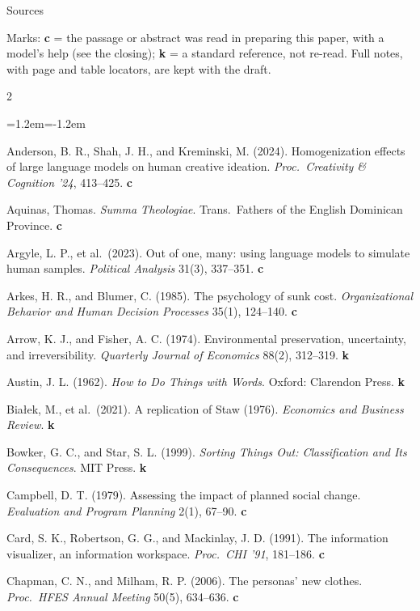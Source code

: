 \documentclass[11pt,a4paper]{article}
\newcounter{art}
\begin{document}
\clearpage
{\centering\large Sources\par}
\vspace{3mm}
\small
\noindent Marks: \textbf{c} = the passage or abstract was read in preparing this paper, with a model's help (see the closing); \textbf{k} = a standard reference, not re-read. Full notes, with page and table locators, are kept with the draft.
\vspace{2mm}
\begin{multicols}{2}\footnotesize\raggedright
\begin{list}{}{\leftmargin=1.2em\itemindent=-1.2em\itemsep=1pt}
\item Anderson, B. R., Shah, J. H., and Kreminski, M. (2024). Homogenization effects of large language models on human creative ideation. \textit{Proc.\ Creativity \& Cognition '24}, 413--425. \textbf{c}
\item Aquinas, Thomas. \textit{Summa Theologiae}. Trans.\ Fathers of the English Dominican Province. \textbf{c}
\item Argyle, L. P., et al.\ (2023). Out of one, many: using language models to simulate human samples. \textit{Political Analysis} 31(3), 337--351. \textbf{c}
\item Arkes, H. R., and Blumer, C. (1985). The psychology of sunk cost. \textit{Organizational Behavior and Human Decision Processes} 35(1), 124--140. \textbf{c}
\item Arrow, K. J., and Fisher, A. C. (1974). Environmental preservation, uncertainty, and irreversibility. \textit{Quarterly Journal of Economics} 88(2), 312--319. \textbf{k}
\item Austin, J. L. (1962). \textit{How to Do Things with Words}. Oxford: Clarendon Press. \textbf{k}
\item Białek, M., et al.\ (2021). A replication of Staw (1976). \textit{Economics and Business Review}. \textbf{k}
\item Bowker, G. C., and Star, S. L. (1999). \textit{Sorting Things Out: Classification and Its Consequences}. MIT Press. \textbf{k}
\item Campbell, D. T. (1979). Assessing the impact of planned social change. \textit{Evaluation and Program Planning} 2(1), 67--90. \textbf{c}
\item Card, S. K., Robertson, G. G., and Mackinlay, J. D. (1991). The information visualizer, an information workspace. \textit{Proc.\ CHI '91}, 181--186. \textbf{c}
\item Chapman, C. N., and Milham, R. P. (2006). The personas' new clothes. \textit{Proc.\ HFES Annual Meeting} 50(5), 634--636. \textbf{c}

\end{list}
\end{multicols}
\end{document}
